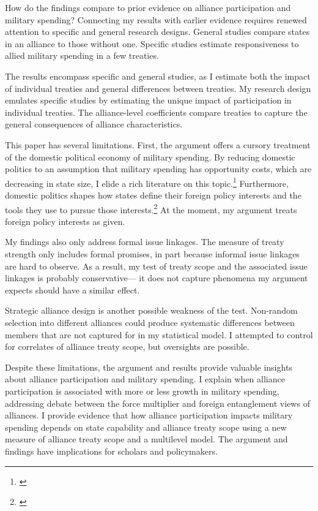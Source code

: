 \documentclass[12pt]{article}
\begin{document}
How do the findings compare to prior evidence on alliance participation and military spending? 
Connecting my results with earlier evidence requires renewed attention to specific and general research designs. 
General studies compare states in an alliance to those without one. 
Specific studies estimate responsiveness to allied military spending in a few treaties. 


The results encompass specific and general studies, as I estimate both the impact of individual treaties and general differences between treaties. 
My research design emulates specific studies by estimating the unique impact of participation in individual treaties. 
The alliance-level coefficients compare treaties to capture the general consequences of alliance characteristics. 


This paper has several limitations.
First, the argument offers a cursory treatment of the domestic political economy of military spending. 
By reducing domestic politics to an assumption that military spending has opportunity costs, which are decreasing in state size, I elide a rich literature on this topic.\footnote{\cite{WhittenWilliams2011, AlptekinLevine2012}}  
Furthermore, domestic politics shapes how states define their foreign policy interests and the tools they use to pursue those interests.\footnote{\cite{Fordham1998, Fordham2011, Narizny2007}}
At the moment, my argument treats foreign policy interests as given.  


My findings also only address formal issue linkages. 
The measure of treaty strength only includes formal promises, in part because informal issue linkages are hard to observe. 
As a result, my test of treaty scope and the associated issue linkages is probably conservative--- it does not capture phenomena my argument expects should have a similar effect. 


Strategic alliance design is another possible weakness of the test. 
Non-random selection into different alliances could produce systematic differences between members that are not captured for in my statistical model. 
I attempted to control for correlates of alliance treaty scope, but oversights are possible. 


Despite these limitations, the argument and results provide valuable insights about alliance participation and military spending. 
I explain when alliance participation is associated with more or less growth in military spending, addressing debate between the force multiplier and foreign entanglement views of alliances.  
I provide evidence that how alliance participation impacts military spending depends on state capability and alliance treaty scope using a new measure of alliance treaty scope and a multilevel model. 
The argument and findings have implications for scholars and policymakers. 
\end{document}

